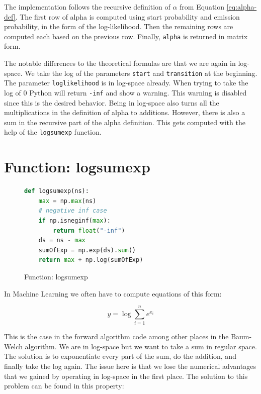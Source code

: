The implementation follows the recursive definition of $\alpha$ from Equation \eqref{eq:alpha-def}. The first row of alpha is computed using start probability and emission probability, in the form of the log-likelihood. Then the remaining rows are computed each based on the previous row. Finally, \texttt{alpha} is returned in matrix form. 

The notable differences to the theoretical formulas are that we are again in log-space. We take the log of the parameters \texttt{start} and \texttt{transition} at the beginning. The parameter \texttt{loglikelihood} is in log-space already. When trying to take the log of 0 Python will return \texttt{-inf} and show a warning. This warning is disabled since this is the desired behavior. Being in log-space also turns all the multiplications in the definition of alpha to additions. However, there is also a sum in the recursive part of the alpha definition. This gets computed with the help of the \texttt{logsumexp} function. 

\section{Function: logsumexp}

\begin{figure}
\begin{singlespace}
\begin{lstlisting}[language=Python]
def logsumexp(ns):
    max = np.max(ns)
    # negative inf case
    if np.isneginf(max):
        return float("-inf")
    ds = ns - max
    sumOfExp = np.exp(ds).sum()
    return max + np.log(sumOfExp)

\end{lstlisting}
\end{singlespace}
\caption{Function: logsumexp}    
\label{fig:logsumexp-listing}
\end{figure}

In Machine Learning we often have to compute equations of this form: 

\begin{equation}
y=\log \sum_{i=1}^{n} e^{x_{i}}
\end{equation}

This is the case in the forward algorithm code among other places in the Baum-Welch algorithm. We are in log-space but we want to take a sum in regular space. The solution is to exponentiate every part of the sum, do the addition, and finally take the log again. The issue here is that we lose the numerical advantages that we gained by operating in log-space in the first place. The solution to this problem can be found in this property:

